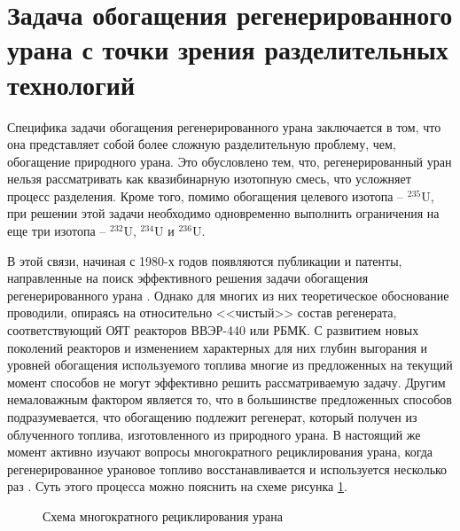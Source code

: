 
\section{Задача обогащения регенерированного урана с точки зрения разделительных технологий}

Специфика задачи обогащения регенерированного урана заключается в том, что она представляет собой более сложную разделительную проблему, чем, обогащение  природного урана.
Это обусловлено тем, что, регенерированный уран нельзя рассматривать как квазибинарную изотопную смесь, что усложняет процесс разделения. Кроме того, помимо обогащения целевого изотопа -- $^{235}$U, при решении этой задачи необходимо одновременно выполнить ограничения на еще три изотопа -- $^{232}$U, $^{234}$U и $^{236}$U.

В этой связи, начиная с 1980-х годов появляются публикации и патенты, направленные на поиск эффективного решения задачи обогащения регенерированного урана \cite{ксенофонтовИсследованиеПроблемыВовлечения1988,borodynyaIssledovanieProblemyVovlecheniya1989,smirnovKaskadnyeShemyZadachah2012,sulaberidzeNekotoryhRazdelitelnyhProblemah2004,kazukihidaSimultaneousEvaluationEffects1986,sidenkoIssledovanieKaskadnyhShem,smirnovObogashchenieRegenerirovannogoUrana2018,prusakovKorrekciyaIzotopnogoSostava2008}. Однако для многих из них теоретическое обоснование проводили, опираясь на относительно <<чистый>> состав регенерата, соответствующий ОЯТ реакторов ВВЭР-440 или РБМК. С развитием новых поколений реакторов и изменением характерных для них глубин выгорания и уровней обогащения используемого топлива многие из предложенных на текущий момент способов не могут эффективно решить рассматриваемую задачу.
Другим немаловажным фактором является то, что в большинстве предложенных способов подразумевается, что обогащению подлежит регенерат, который получен из облученного топлива, изготовленного из природного урана. В настоящий же момент активно изучают вопросы многократного рециклирования урана, когда регенерированное урановое топливо восстанавливается и используется несколько раз \cite{rodionovaAnalizTehnikoekonomicheskihHarakteristik2019,smirnovFizikotehnicheskieProblemyObogashcheniya2020}. Суть этого процесса можно пояснить на схеме рисунка \ref{recycle}.

\begin{figure}[ht]
  \caption{Схема многократного рециклирования урана}\label{recycle}
\end{figure}

